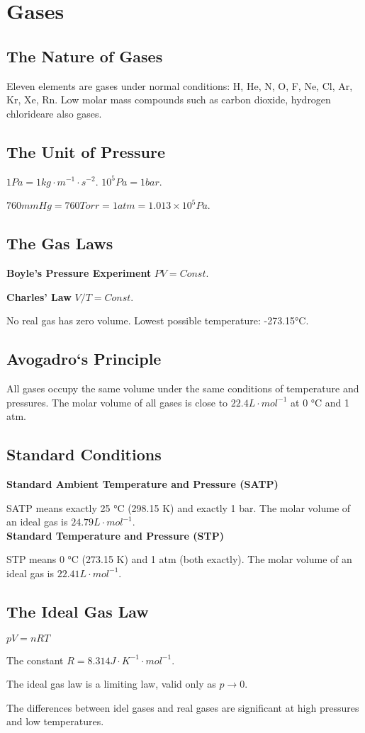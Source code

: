 \documentclass[a4paper,12pt]{article}
\begin{document}
\newpage
\section{Gases}
\subsection{The Nature of Gases} Eleven elements are gases under normal conditions: H, He, N, O, F, Ne, Cl, Ar, Kr, Xe, Rn. Low molar mass compounds such as carbon dioxide, hydrogen chlorideare also gases.
\subsection{The Unit of Pressure}
$1 Pa=1 kg\cdot m^{-1}\cdot s^{-2}$. $10^{5} Pa=1 bar$.\par $760 mmHg=760 Torr=1atm=1.013\times 10^{5} Pa$.
\subsection{The Gas Laws}
\textbf{Boyle's Pressure Experiment} $PV=Const.$\par
\textbf{Charles' Law} $V/T=Const.$\par No real gas has zero volume. Lowest possible temperature: -273.15°C.
\subsection{Avogadro‘s Principle}
All gases occupy the same volume under the same conditions of temperature
and pressures. The molar volume of all gases is close to $22.4 L\cdot mol^{-1}$ at 0 °C and 1 atm.
\subsection{Standard Conditions}
\noindent\textbf{Standard Ambient Temperature and Pressure (SATP)}\par SATP means exactly 25 °C (298.15 K) and exactly 1 bar. The molar volume of an ideal gas is $24.79 L\cdot mol^{-1}$.\\
\noindent\textbf{Standard Temperature and Pressure (STP)}\par STP means 0 °C (273.15 K) and 1 atm (both exactly).
The molar volume of an ideal gas is $22.41 L\cdot mol^{-1}$.
\subsection{The Ideal Gas Law}
\begin{center}
$pV=nRT$
\end{center}\par
The constant $R = 8.314 J\cdot K^{-1}\cdot mol^{-1}$.\par
The ideal gas law is a limiting law, valid only as $p\rightarrow0$.\par
The differences between idel gases and real gases are significant at high pressures and low temperatures.
\end{document}
